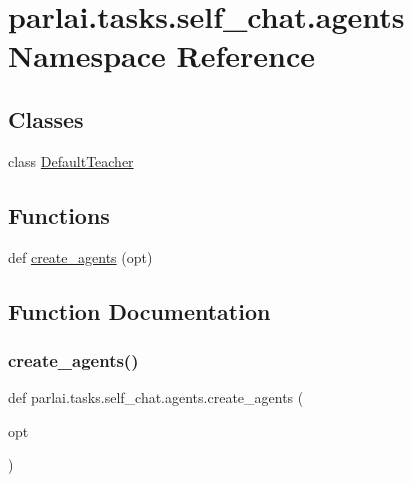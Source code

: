 \hypertarget{namespaceparlai_1_1tasks_1_1self__chat_1_1agents}{}\section{parlai.\+tasks.\+self\+\_\+chat.\+agents Namespace Reference}
\label{namespaceparlai_1_1tasks_1_1self__chat_1_1agents}
\subsection*{Classes}
\begin{DoxyCompactItemize}
\item 
class \hyperlink{classparlai_1_1tasks_1_1self__chat_1_1agents_1_1DefaultTeacher}{Default\+Teacher}
\end{DoxyCompactItemize}
\subsection*{Functions}
\begin{DoxyCompactItemize}
\item 
def \hyperlink{namespaceparlai_1_1tasks_1_1self__chat_1_1agents_a5e83b2495ef17f68467460ec2a646434}{create\+\_\+agents} (opt)
\end{DoxyCompactItemize}


\subsection{Function Documentation}
\mbox{\label{namespaceparlai_1_1tasks_1_1self__chat_1_1agents_a5e83b2495ef17f68467460ec2a646434}} 
\subsubsection{\texorpdfstring{create\+\_\+agents()}{create\_agents()}}
{\footnotesize\ttfamily def parlai.\+tasks.\+self\+\_\+chat.\+agents.\+create\+\_\+agents (\begin{DoxyParamCaption}\item[{}]{opt }\end{DoxyParamCaption})}



